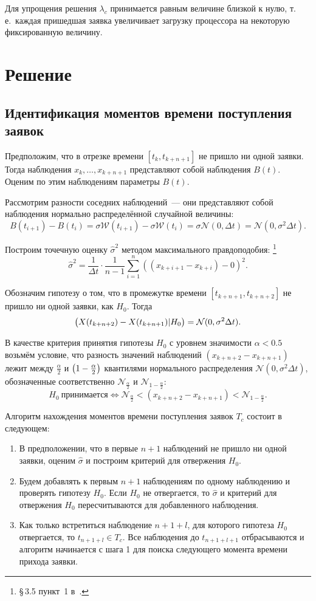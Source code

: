 \documentclass[a4paper,10pt]{article}
\begin{document}
Для упрощения решения $\lambda_c$ принимается равным величине близкой к нулю,
т.\,е.~каждая пришедшая заявка увеличивает загрузку процессора на некоторую 
фиксированную величину.

\section{Решение}
\subsection{Идентификация моментов времени поступления заявок}
Предположим, что в отрезке времени $[t_k, t_{k+n+1}]$ 
не пришло ни одной заявки.
Тогда наблюдения $x_k,\ldots,x_{k+n+1}$ представляют собой наблюдения
$B(t)$.
Оценим по этим наблюдениям параметры $B(t)$.

Рассмотрим разности соседних наблюдений~--- они представляют собой наблюдения 
нормально распределённой случайной величины:
$$B(t_{i+1}) - B(t_i) = 
    \sigma \mathcal{W}(t_{i+1}) - \sigma \mathcal{W}(t_i) = 
    \sigma \mathcal{N}(0, \Delta t) = 
    \mathcal{N}(0, \sigma^2 \Delta t).$$

Построим точечную оценку $\widehat{\sigma}^2$ 
методом максимального правдоподобия:%
\footnote{\S\,3.5 пункт~1 в~\cite{ivchmed2010matstat}.}
%
$$\widehat{\sigma}^2 = 
    \frac{1}{\Delta t}\cdot\frac{1}{n-1}
        \sum\limits_{i=1}^n ((x_{k+i+1} - x_{k+i}) - 0)^2.$$

Обозначим гипотезу о том, что в промежутке времени 
$[t_{k+n+1}, t_{k+n+2}]$ не пришло ни одной заявки, 
как $H_0$.
Тогда 
$$\del{X(t_{k+n+2})-X(t_{k+n+1}) \vert H_0} = 
    \mathcal{N}(0, \sigma^2 \Delta t).$$

В качестве критерия принятия гипотезы $H_0$ с уровнем значимости 
$\alpha < 0.5$ 
возьмём условие, что разность значений наблюдений $(x_{k+n+2}-x_{k+n+1})$
лежит между $\frac{\alpha}{2}$ и $\del{1 - \frac{\alpha}{2}}$ квантилями
нормального распределения $\mathcal{N}(0, \sigma^2 \Delta t)$,
обозначенные соответственно $\mathcal{N}_{\frac{\alpha}{2}}$ и 
$\mathcal{N}_{1 - \frac{\alpha}{2}}$:
$$
H_0 \  \mathrm{\text{принимается}} \iff
    \mathcal{N}_{\frac{\alpha}{2}} < 
        (x_{k+n+2}-x_{k+n+1}) < 
	    \mathcal{N}_{1 - \frac{\alpha}{2}}.
$$

Алгоритм нахождения моментов времени поступления заявок $T_c$ 
состоит в следующем:
\begin{enumerate}
  \item В предположении, что в первые $n+1$ наблюдений не пришло ни одной 
  заявки, оценим $\widehat{\sigma}$ и построим критерий для отвержения $H_0$.
  \item Будем добавлять к первым $n+1$ наблюдениям по одному наблюдению и 
  проверять гипотезу $H_0$.
  Если $H_0$ не отвергается, то $\widehat{\sigma}$ и критерий для отвержения $H_0$ 
  пересчитываются для добавленного наблюдения.
  \item Как только встретиться наблюдение $n+1+l$, для которого гипотеза $H_0$
  отвергается, то \mbox{$t_{n+1+l} \in T_c$}. 
  Все наблюдения до $t_{n+1+l+1}$ отбрасываются и алгоритм начинается с шага 1
  для поиска следующего момента времени прихода заявки.
\end{enumerate}
\end{document}
